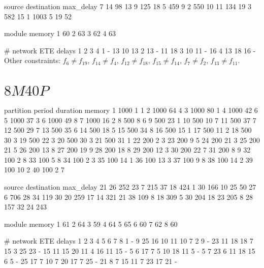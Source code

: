 source destination max_delay
7      14          98
13     9           125
18     5           459
9      2           550
10     11          134
19     3           582
15     1           1003
5      19          52

module memory
1      60
2      63
3      62
4      63

# network ETE delays
  1  2  3  4
1 -  13 10 13
2 13 -  11 18
3 10 11 -  16
4 13 18 16 -
Other constraints: $f_{6} ≠ f_{19}$, $f_{14} ≠ f_{4}$, $f_{12} ≠ f_{18}$, $f_{15} ≠ f_{14}$, $f_{7} ≠ f_{2}$, $f_{13} ≠ f_{11}$.

\section{\texorpdfstring{$8M40P$}{8M40P}}

partition period duration memory
1         1000   1        1
2         1000   64       4
3         1000   80       1
4         1000   42       6
5         1000   37       3
6         1000   49       8
7         1000   16       2
8         500    8        6
9         500    23       1
10        500    10       7
11        500    37       7
12        500    29       7
13        500    35       6
14        500    18       5
15        500    34       8
16        500    15       1
17        500    11       2
18        500    30       3
19        500    22       3
20        500    30       3
21        500    31       1
22        200    2        3
23        200    9        5
24        200    21       3
25        200    21       5
26        200    13       8
27        200    19       9
28        200    18       8
29        200    12       3
30        200    22       7
31        200    8        9
32        100    2        8
33        100    5        8
34        100    2        3
35        100    14       1
36        100    13       3
37        100    9        8
38        100    14       2
39        100    10       2
40        100    2        7

source destination max_delay
21     26          252
23     7           215
37     18          424
1      30          166
10     25          50
27     6           706
28     34          119
30     20          259
17     14          321
21     38          109
8      18          309
5      30          204
18     23          205
8      28          157
32     24          243

module memory
1      61
2      64
3      59
4      64
5      65
6      60
7      62
8      60

# network ETE delays
   1  2  3  4  5  6  7  8
1  -  9  25 16 10 11 10 7
2  9  -  23 11 18 18 7  15
3  25 23 -  15 11 15 20 11
4  16 11 15 -  5  6  17 7
5  10 18 11 5  -  5  7  23
6  11 18 15 6  5  -  25 17
7  10 7  20 17 7  25 -  21
8  7  15 11 7  23 17 21 -


